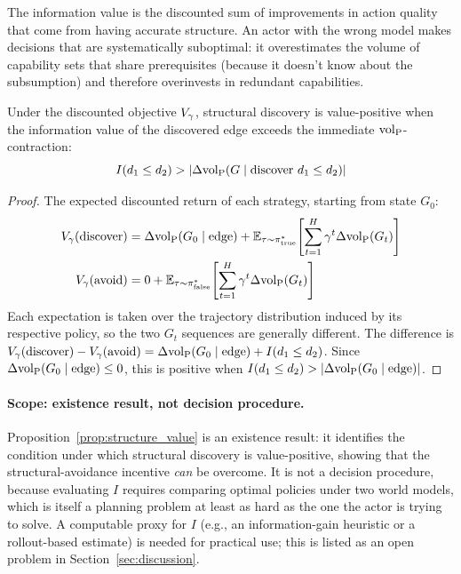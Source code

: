 The information value is the discounted sum of improvements in action quality
that come from having accurate structure. An actor with the wrong model
makes decisions that are systematically suboptimal: it overestimates the
volume of capability sets that share prerequisites (because it doesn't know
about the subsumption) and therefore overinvests in redundant capabilities.

\begin{proposition}
\label{prop:structure_value}
Under the discounted objective $V_\gamma$, structural discovery is
    value-positive when the information value of the discovered edge exceeds
    the immediate ${\operatorname{vol}_{\mathrm{P}}}$-contraction:
\begin{equation}
\label{eq:structure_criterion}
I(d_1 \leq d_2) > |\Delta {\operatorname{vol}_{\mathrm{P}}}(G \mid \text{discover } d_1 \leq d_2)|
\end{equation}
\end{proposition}

\begin{proof}
The expected discounted return of each strategy, starting from state $G_0$:
\begin{align*}
V_\gamma(\text{discover}) &= \Delta {\operatorname{vol}_{\mathrm{P}}}(G_0 \mid \text{edge}) +
    \mathbb{E}_{\tau \sim \pi^*_{\text{true}}}\!\left[
    \sum_{t=1}^{H} \gamma^t \Delta {\operatorname{vol}_{\mathrm{P}}}(G_t)\right] \\
V_\gamma(\text{avoid}) &= 0 +
    \mathbb{E}_{\tau \sim \pi^*_{\text{false}}}\!\left[
    \sum_{t=1}^{H} \gamma^t \Delta {\operatorname{vol}_{\mathrm{P}}}(G_t)\right]
\end{align*}
Each expectation is taken over the trajectory distribution induced by its
respective policy, so the two $G_t$ sequences are generally different. The
difference is $V_\gamma(\text{discover}) - V_\gamma(\text{avoid}) =
\Delta {\operatorname{vol}_{\mathrm{P}}}(G_0 \mid \text{edge}) + I(d_1 \leq d_2)$. Since
$\Delta {\operatorname{vol}_{\mathrm{P}}}(G_0 \mid \text{edge}) \leq 0$, this is positive when
$I(d_1 \leq d_2) > |\Delta {\operatorname{vol}_{\mathrm{P}}}(G_0 \mid \text{edge})|$.
\end{proof}

\paragraph{Scope: existence result, not decision procedure.}
Proposition~\ref{prop:structure_value} is an existence result: it identifies
the condition under which structural discovery is value-positive, showing
that the structural-avoidance incentive \emph{can} be overcome. It is not a
decision procedure, because evaluating $I$ requires comparing optimal
policies under two world models, which is itself a planning problem at least
as hard as the one the actor is trying to solve. A computable proxy for $I$
(e.g., an information-gain heuristic or a rollout-based estimate) is needed
for practical use; this is listed as an open problem in
Section~\ref{sec:discussion}.

